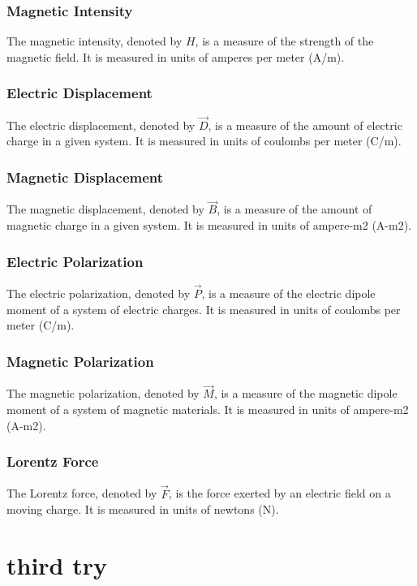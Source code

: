 \documentclass{article}
\begin{document}
\subsubsection{Magnetic Intensity} The magnetic intensity, denoted by $H$, is a
measure of the strength of the magnetic field. It is measured in units of
amperes per meter (A/m).

\subsubsection{Electric Displacement} The electric displacement, denoted by
$\vec{D}$, is a measure of the amount of electric charge in a given system. It
is measured in units of coulombs per meter (C/m).

\subsubsection{Magnetic Displacement} The magnetic displacement, denoted by
$\vec{B}$, is a measure of the amount of magnetic charge in a given system. It
is measured in units of ampere-m2 (A-m2).

\subsubsection{Electric Polarization} The electric polarization, denoted by
$\vec{P}$, is a measure of the electric dipole moment of a system of electric
charges. It is measured in units of coulombs per meter (C/m).

\subsubsection{Magnetic Polarization} The magnetic polarization, denoted by
$\vec{M}$, is a measure of the magnetic dipole moment of a system of magnetic
materials. It is measured in units of ampere-m2 (A-m2).

\subsubsection{Lorentz Force} The Lorentz force, denoted by $\vec{F}$, is the
force exerted by an electric field on a moving charge. It is measured in units
of newtons (N).

\section{third try} %
\label{sec:third try} 
\end{document}
